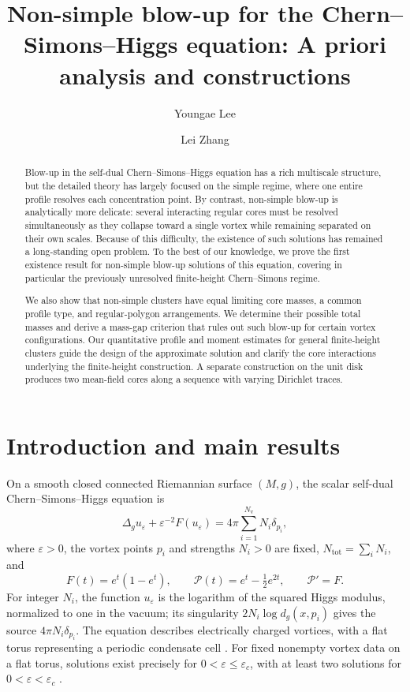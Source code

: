 \documentclass[11pt,reqno]{amsart}
\title[Non-simple blow-up for the Chern--Simons--Higgs equation]
{Non-simple blow-up for the Chern--Simons--Higgs equation:
A priori analysis and constructions}
\author{Youngae Lee}
\author{Lei Zhang}
\date{}
\numberwithin{equation}{section}
\theoremstyle{definition}
\theoremstyle{remark}
\newcommand{\eps}{\varepsilon}
\newcommand{\tot}{\mathrm{tot}}
\begin{document}
 
\begin{abstract}

 Blow-up in the self-dual Chern--Simons--Higgs equation has a rich
multiscale structure, but the detailed theory has largely focused on
the simple regime, where one entire profile resolves each
concentration point. By contrast, non-simple blow-up is analytically more delicate:
several interacting regular cores must be resolved simultaneously
as they collapse toward a single vortex while remaining separated
on their own scales. Because of this difficulty, the existence of
such solutions has remained a long-standing open problem. To the best of our
knowledge, we prove the first existence result for non-simple blow-up
solutions of this equation, covering in particular the previously
unresolved finite-height Chern--Simons regime.

We also show that non-simple clusters have equal
limiting core masses, a common profile type, and regular-polygon
arrangements. We determine their possible total masses and derive a
mass-gap criterion that rules out such blow-up for certain vortex
configurations. Our quantitative profile and moment estimates for general
finite-height clusters guide the design of the approximate solution
and clarify the core interactions underlying the finite-height
construction. A separate
construction on the unit disk produces two mean-field cores along a
sequence with varying Dirichlet traces.
\end{abstract}

\maketitle

\section{Introduction and main results}\label{sec:introduction}

On a smooth closed connected Riemannian surface $(M,g)$, the scalar
self-dual Chern--Simons--Higgs equation is
\begin{equation}\label{eq:main}
 \Delta_gu_\eps+\eps^{-2}F(u_\eps)
 =4\pi\sum_{i=1}^{N_{\mathrm v}}N_i\delta_{p_i},
\end{equation}
where $\eps>0$, the vortex points $p_i$ and strengths $N_i>0$ are fixed,
$N_{\tot}=\sum_iN_i$, and
\begin{equation}\label{eq:F-definition}
 F(t)=e^t(1-e^t),\qquad \mathcal P(t)=e^t-\tfrac12e^{2t},\qquad \mathcal P'=F.
\end{equation}
For integer $N_i$, the function $u_\eps$ is the logarithm of the squared
Higgs modulus, normalized to one in the vacuum; its singularity
$2N_i\log d_g(x,p_i)$ gives the source $4\pi N_i\delta_{p_i}$.
The equation describes electrically charged vortices, with a flat
torus representing a periodic condensate cell
\cite{HongKimPac,JackiwWeinberg,SpruckYang}.  
For fixed nonempty   vortex data on a flat torus, solutions
exist precisely for $0<\eps\le\eps_c$, with at least two solutions for
$0<\eps<\eps_c$ \cite{CaffarelliYang,Tarantello}.
\end{document}
